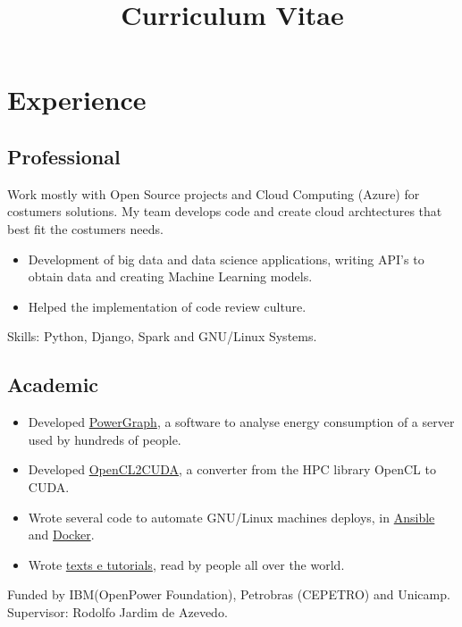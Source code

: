 \documentclass[10pt, a4paper, roman]{moderncv} %
\title{Curriculum Vitae}
\begin{document}
\makecvtitle %

\section{Experience}
\subsection{Professional}

{
Work mostly with Open Source projects and Cloud Computing (Azure) for costumers solutions. My team develops code and create cloud archtectures that best fit the costumers needs.
}

{
    \begin{itemize}
        \item Development of big data and data science applications, writing API's to obtain data and creating Machine Learning models. 
        \item Helped the implementation of code review culture.
    \end{itemize}
    Skills: Python, Django, Spark and GNU/Linux Systems.
}

\subsection{Academic}
{
    \begin{itemize}
        \item Developed \href{https://github.com/Guilhermeslucas/powergraph}{PowerGraph}, a software to analyse energy consumption of a server used by hundreds of people.
        \item Developed \href{https://github.com/Guilhermeslucas/OpenCL2CUDA}{OpenCL2CUDA}, a converter from the HPC library OpenCL to CUDA.
        \item Wrote several code to automate GNU/Linux machines deploys, in \href{https://github.com/Guilhermeslucas/Ansible-Code}{Ansible} and 
            \href{https://github.com/Guilhermeslucas/Dockerfiles}{Docker}.
        \item Wrote \href{http://openpower.ic.unicamp.br/blog/}{texts e tutorials}, read by people all over the world. 
    \end{itemize}
    Funded by IBM(OpenPower Foundation), Petrobras (CEPETRO) and Unicamp.\\
    Supervisor: Rodolfo Jardim de Azevedo.
}
\end{document}
